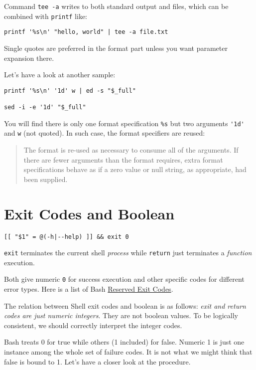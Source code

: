 Command \lstinline|tee -a| writes to both standard output and
files, which can be combined with \lstinline|printf| like:

\begin{lstlisting}
printf '%s\n' "hello, world" | tee -a file.txt
\end{lstlisting}

Single quotes are preferred in the format part unless you want
parameter expansion there.

Let's have a look at another sample:

\begin{lstlisting}
printf '%s\n' '1d' w | ed -s "$_full"

sed -i -e '1d' "$_full"
\end{lstlisting}

You will find there is only one format specification \verb|%s| but
two arguments \verb|'1d'| and \verb|w| (not quoted). In such case,
the format specifiers are reused:

\begin{quotation}
  The format is re-used as necessary to consume all of the
  arguments. If there are fewer arguments than the format
  requires, extra format specifications behave as if a zero value
  or null string, as appropriate, had been supplied.
\end{quotation}

\section{Exit Codes and Boolean}
\label{sec:exit-codes-boolean}

\begin{lstlisting}
[[ "$1" = @(-h|--help) ]] && exit 0
\end{lstlisting}

\lstinline|exit| terminates the current shell \textit{process}
while \lstinline|return| just terminates a \textit{function}
execution.

Both give numeric \verb|0| for success execution and other
specific codes for different error types. Here is a list of Bash
\href{http://tldp.org/LDP/abs/html/exitcodes.html#EXITCODESREF}{Reserved
  Exit Codes}.

The relation between Shell exit codes and boolean is as follows:
\textit{exit and return codes are just numeric integers}. They are
not boolean values. To be logically consistent, we should
correctly interpret the integer codes.

Bash treats 0 for true while others (1 included) for
false. Numeric 1 is just one instance among the whole set of
failure codes. It is not what we might think that false is bound
to 1. Let's have a closer look at the procedure.

